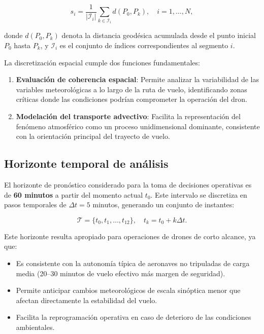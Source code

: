 \documentclass[
  spanish,
  us-letterpaper,
]{scrreprt}
\providecommand{\tightlist}{%
  \setlength{\itemsep}{0pt}\setlength{\parskip}{0pt}}
\numberwithin{equation}{section}
\begin{document}
\[
s_i = \frac{1}{|\mathcal{I}_i|} \sum_{k \in \mathcal{I}_i} d(P_0, P_k), \quad i = 1, \dots, N,
\]

donde \(d(P_0, P_k)\) denota la distancia geodésica acumulada desde el
punto inicial \(P_0\) hasta \(P_k\), y \(\mathcal{I}_i\) es el conjunto
de índices correspondientes al segmento \(i\).

La discretización espacial cumple dos funciones fundamentales:

\begin{enumerate}
\def\labelenumi{\arabic{enumi}.}
\item
  \textbf{Evaluación de coherencia espacial}: Permite analizar la
  variabilidad de las variables meteorológicas a lo largo de la ruta de
  vuelo, identificando zonas críticas donde las condiciones podrían
  comprometer la operación del dron.
\item
  \textbf{Modelación del transporte advectivo}: Facilita la
  representación del fenómeno atmosférico como un proceso unidimensional
  dominante, consistente con la orientación principal del trayecto de
  vuelo.
\end{enumerate}

\subsection{Horizonte temporal de
análisis}\label{horizonte-temporal-de-anuxe1lisis}

El horizonte de pronóstico considerado para la toma de decisiones
operativas es de \textbf{60 minutos} a partir del momento actual
\(t_0\). Este intervalo se discretiza en pasos temporales de
\(\Delta t = 5\) minutos, generando un conjunto de instantes:

\[
\mathcal{T} = \{t_0, t_1, \dots, t_{12}\}, \quad t_k = t_0 + k\Delta t.
\]

Este horizonte resulta apropiado para operaciones de drones de corto
alcance, ya que:

\begin{itemize}
\tightlist
\item
  Es consistente con la autonomía típica de aeronaves no tripuladas de
  carga media (20--30 minutos de vuelo efectivo más margen de
  seguridad).
\item
  Permite anticipar cambios meteorológicos de escala sinóptica menor que
  afectan directamente la estabilidad del vuelo.
\item
  Facilita la reprogramación operativa en caso de deterioro de las
  condiciones ambientales.
\end{itemize}
\end{document}
